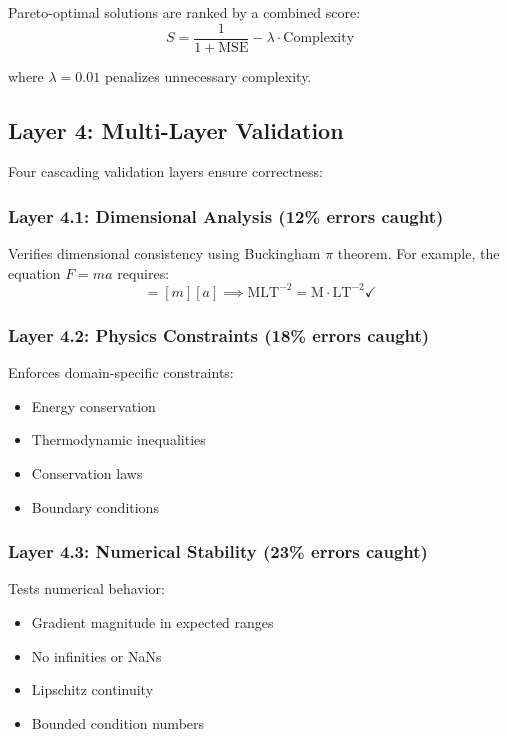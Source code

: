 \documentclass[twoside,11pt]{article}
\begin{document}
Pareto-optimal solutions are ranked by a combined score:
\begin{equation}
S = \frac{1}{1 + \text{MSE}} - \lambda \cdot \text{Complexity}
\end{equation}

where $\lambda = 0.01$ penalizes unnecessary complexity.

\subsection{Layer 4: Multi-Layer Validation}
\label{sec:validation}

Four cascading validation layers ensure correctness:

\subsubsection{Layer 4.1: Dimensional Analysis (12\% errors caught)}

Verifies dimensional consistency using Buckingham $\pi$ theorem. For example, the equation $F = ma$ requires:
\begin{equation}
[F] = [m][a] \implies \text{MLT}^{-2} = \text{M} \cdot \text{LT}^{-2} \checkmark
\end{equation}

\subsubsection{Layer 4.2: Physics Constraints (18\% errors caught)}

Enforces domain-specific constraints:
\begin{itemize}
\item Energy conservation
\item Thermodynamic inequalities
\item Conservation laws
\item Boundary conditions
\end{itemize}

\subsubsection{Layer 4.3: Numerical Stability (23\% errors caught)}

Tests numerical behavior:
\begin{itemize}
\item Gradient magnitude in expected ranges
\item No infinities or NaNs
\item Lipschitz continuity
\item Bounded condition numbers
\end{itemize}
\end{document}

